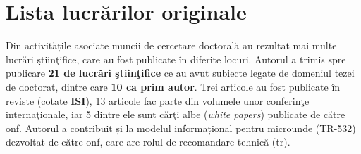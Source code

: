 \section{Lista lucrărilor originale \label{sec:papers}}

Din activitățile asociate muncii de cercetare doctorală au rezultat mai multe lucrări ştiinţifice, care au fost publicate în diferite locuri. Autorul a trimis spre publicare \textbf{21 de lucrări ştiinţifice} ce au avut subiecte legate de domeniul tezei de doctorat, dintre care \textbf{10 ca prim autor}. Trei articole au fost publicate în reviste (cotate \textbf{ISI}), 13 articole fac parte din volumele unor conferinţe internaţionale, iar 5 dintre ele sunt cărţi albe (\textit{white papers}) publicate de către \gls{onf}. Autorul a contribuit și la modelul informațional pentru microunde (TR-532) dezvoltat de către \gls{onf}, care are rolul de recomandare tehnică (\gls{tr}).

